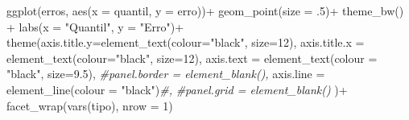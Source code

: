 \documentclass[
]{article}
\newenvironment{Shaded}{\begin{snugshade}}{\end{snugshade}}
\newcommand{\AttributeTok}[1]{\textcolor[rgb]{0.77,0.63,0.00}{#1}}
\newcommand{\CommentTok}[1]{\textcolor[rgb]{0.56,0.35,0.01}{\textit{#1}}}
\newcommand{\DecValTok}[1]{\textcolor[rgb]{0.00,0.00,0.81}{#1}}
\newcommand{\FloatTok}[1]{\textcolor[rgb]{0.00,0.00,0.81}{#1}}
\newcommand{\FunctionTok}[1]{\textcolor[rgb]{0.00,0.00,0.00}{#1}}
\newcommand{\NormalTok}[1]{#1}
\newcommand{\SpecialCharTok}[1]{\textcolor[rgb]{0.00,0.00,0.00}{#1}}
\newcommand{\StringTok}[1]{\textcolor[rgb]{0.31,0.60,0.02}{#1}}
\begin{document}
\begin{Shaded}
\begin{Highlighting}[]
\FunctionTok{ggplot}\NormalTok{(erros, }\FunctionTok{aes}\NormalTok{(}\AttributeTok{x =}\NormalTok{ quantil, }\AttributeTok{y =}\NormalTok{ erro))}\SpecialCharTok{+}
  \FunctionTok{geom\_point}\NormalTok{(}\AttributeTok{size =}\NormalTok{ .}\DecValTok{5}\NormalTok{)}\SpecialCharTok{+}
  \FunctionTok{theme\_bw}\NormalTok{() }\SpecialCharTok{+}
  \FunctionTok{labs}\NormalTok{(}\AttributeTok{x =} \StringTok{"Quantil"}\NormalTok{, }\AttributeTok{y =} \StringTok{"Erro"}\NormalTok{)}\SpecialCharTok{+}
  \FunctionTok{theme}\NormalTok{(}\AttributeTok{axis.title.y=}\FunctionTok{element\_text}\NormalTok{(}\AttributeTok{colour=}\StringTok{"black"}\NormalTok{, }\AttributeTok{size=}\DecValTok{12}\NormalTok{),}
        \AttributeTok{axis.title.x =} \FunctionTok{element\_text}\NormalTok{(}\AttributeTok{colour=}\StringTok{"black"}\NormalTok{, }\AttributeTok{size=}\DecValTok{12}\NormalTok{),}
        \AttributeTok{axis.text =} \FunctionTok{element\_text}\NormalTok{(}\AttributeTok{colour =} \StringTok{"black"}\NormalTok{, }\AttributeTok{size=}\FloatTok{9.5}\NormalTok{),}
        \CommentTok{\#panel.border = element\_blank(),}
        \AttributeTok{axis.line =} \FunctionTok{element\_line}\NormalTok{(}\AttributeTok{colour =} \StringTok{"black"}\NormalTok{)}\CommentTok{\#,}
        \CommentTok{\#panel.grid = element\_blank()}
\NormalTok{        )}\SpecialCharTok{+}
  \FunctionTok{facet\_wrap}\NormalTok{(}\FunctionTok{vars}\NormalTok{(tipo), }\AttributeTok{nrow =} \DecValTok{1}\NormalTok{)}
\end{Highlighting}
\end{Shaded}
\end{document}
